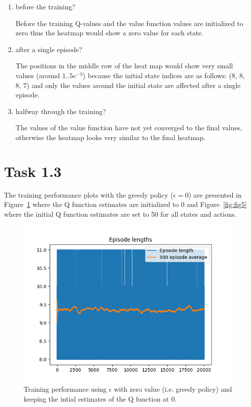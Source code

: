 \documentclass[12pt]{article}
\begin{document}
\begin{enumerate}[label=(\alph*)]
    \item before the training?
   
Before the training Q-values and the value function values are initialized to zero thus the heatmap would show a zero value for each state.

    \item after a single episode?

The positions in the middle row of the heat map would show very small values (around $1..5e^{-3}$) because the initial state indices are as follows: (8, 8, 8, 7) and only the values around the initial state are affected after a single episode.
    
    \item halfway through the training?
    
The values of the value function have not yet converged to the final values, otherwise the heatmap looks very similar to the final heatmap. 

\end{enumerate}


\section*{Task 1.3}

The training performance plots with the greedy policy ($\epsilon=0$) are presented 
in Figure~\ref*{fig:fig4} where the Q function estimates are initialized to 0 and 
Figure~\ref*{fig:fig5} where the initial Q function estimates are set to 50 for all states and actions. 
\newline

\pagebreak


\begin{figure}[h] 
	\centering  %
    \includegraphics[width=0.9\columnwidth]{img/Figure_4_task1_3a_episode_reward.png}
	\caption{Training performance using $\epsilon$ with zero value (i.e. greedy policy) and 
	keeping the intial estimates of the Q function at 0.}
	\label{fig:fig4}
\end{figure}
\end{document}
